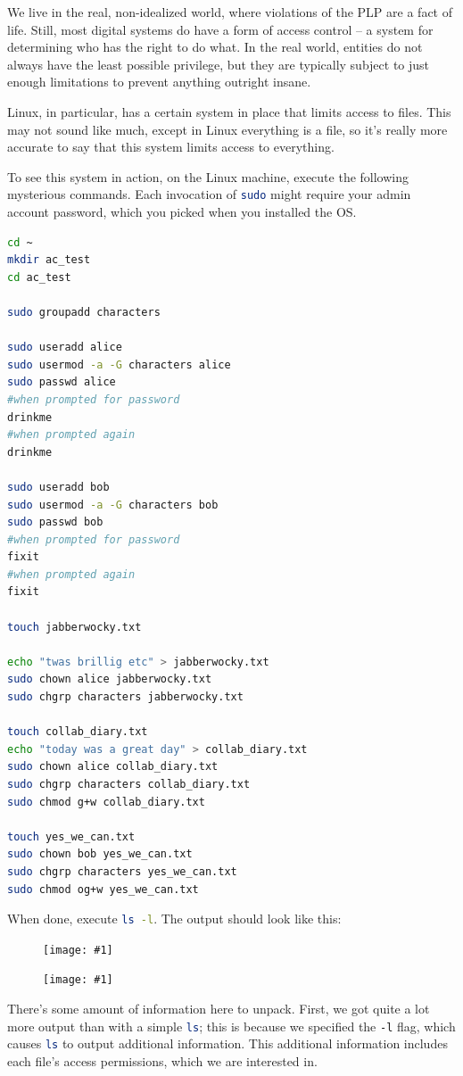 \documentclass{article}
\newcommand{\displayimage}[1] {
\begin{figure}[H]
    \centering
    \texttt{[image: \#1]} 
\end{figure}
}
\newcommand{\wrapimageright}[1] {
    \begin{figure}
        \begin{center}
            \texttt{[image: \#1]} 
        \end{center}
    \end{figure}
}
\newcommand{\xcode}[2]{\colorbox{ubuntuback}{\lstinline[language=#1]|#2|}}
\begin{document}
We live in the real, non-idealized world, where violations of the PLP are a fact of life. Still, most digital systems do have a form of access control -- a system for determining who has the right to do what. In the real world, entities do not always have the least possible privilege, but they are typically subject to just enough limitations to prevent anything outright insane.

Linux, in particular, has a certain system in place that limits access to files. This may not sound like much, except in Linux everything is a file, so it's really more accurate to say that this system limits access to everything.

To see this system in action, on the Linux machine, execute the following mysterious commands. Each invocation of \xcode{bash}{sudo} might require your admin account password, which you picked when you installed the OS.
\begin{lstlisting}[language=bash]
cd ~
mkdir ac_test
cd ac_test

sudo groupadd characters

sudo useradd alice
sudo usermod -a -G characters alice
sudo passwd alice
#when prompted for password
drinkme
#when prompted again
drinkme

sudo useradd bob
sudo usermod -a -G characters bob
sudo passwd bob
#when prompted for password
fixit
#when prompted again
fixit

touch jabberwocky.txt

echo "twas brillig etc" > jabberwocky.txt
sudo chown alice jabberwocky.txt
sudo chgrp characters jabberwocky.txt

touch collab_diary.txt
echo "today was a great day" > collab_diary.txt
sudo chown alice collab_diary.txt
sudo chgrp characters collab_diary.txt
sudo chmod g+w collab_diary.txt

touch yes_we_can.txt
sudo chown bob yes_we_can.txt
sudo chgrp characters yes_we_can.txt
sudo chmod og+w yes_we_can.txt
\end{lstlisting}

When done, execute \xcode{bash}{ls -l}. The output should look like this: 

\displayimage{./images/access_control_file_list.png}

\wrapimageright{./images/file_permissions_how_to_read.png}
There's some amount of information here to unpack. First, we got quite a lot more output than with a simple \xcode{bash}{ls}; this is because we specified the \xcode{bash}{-l} flag, which causes \xcode{bash}{ls} to output additional information. This additional information includes each file's access permissions, which we are interested in.
\end{document}
